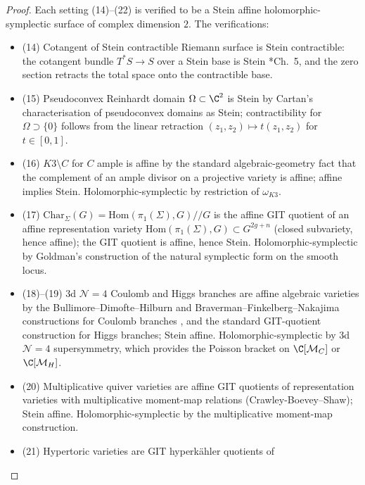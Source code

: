 \begin{proof}
Each setting (14)--(22) is verified to be a Stein affine
holomorphic-symplectic surface of complex dimension $2$.  The
verifications:
\begin{itemize}
  \item (14) Cotangent of Stein contractible Riemann surface is
        Stein contractible: the cotangent bundle $T^*S\to S$ over a
        Stein base is Stein \cite{hormander-vol1}*{Ch.~5}, and the
        zero section retracts the total space onto the contractible
        base.
  \item (15) Pseudoconvex Reinhardt domain $\Omega\subset\C^2$ is
        Stein by Cartan's characterisation of pseudoconvex domains as
        Stein; contractibility for $\Omega\supset\{0\}$ follows from
        the linear retraction $(z_1,z_2)\mapsto t(z_1,z_2)$ for
        $t\in[0,1]$.
  \item (16) $K3\setminus C$ for $C$ ample is affine by the standard
        algebraic-geometry fact that the complement of an ample
        divisor on a projective variety is affine; affine implies
        Stein.  Holomorphic-symplectic by restriction of
        $\omega_{K3}$.
  \item (17) $\mathrm{Char}_\Sigma(G)=\mathrm{Hom}(\pi_1(\Sigma),G)/\!/G$
        is the affine GIT quotient of an affine representation
        variety $\mathrm{Hom}(\pi_1(\Sigma),G)\subset G^{2g+n}$
        (closed subvariety, hence affine); the GIT quotient is
        affine, hence Stein.  Holomorphic-symplectic by Goldman's
        construction of the natural symplectic form on the smooth
        locus.
  \item (18)--(19) 3d $\mathcal N=4$ Coulomb and Higgs branches are
        affine algebraic varieties by the
        Bullimore--Dimofte--Hilburn and
        Braverman--Finkelberg--Nakajima constructions for Coulomb
        branches \cite{costello-paquette-twisted-holography}, and the
        standard GIT-quotient construction for Higgs branches; Stein
        affine.  Holomorphic-symplectic by 3d $\mathcal N=4$
        supersymmetry, which provides the Poisson bracket on
        $\C[\mathcal M_C]$ or $\C[\mathcal M_H]$.
  \item (20) Multiplicative quiver varieties are affine GIT quotients
        of representation varieties with multiplicative moment-map
        relations (Crawley-Boevey--Shaw); Stein affine.
        Holomorphic-symplectic by the multiplicative moment-map
        construction.
  \item (21) Hypertoric varieties are GIT hyperkähler quotients of

\end{itemize}
\end{proof}

